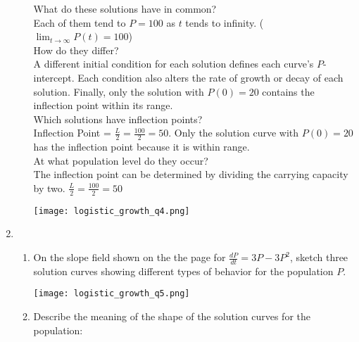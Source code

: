 \documentclass[10pt,letterpaper]{report}
\begin{document}
\begin{enumerate}
\begin{enumerate}
{    What do these solutions have in common? \\
    
    Each of them tend to $P=100$ as $t$ tends to infinity. ($\lim_{t\to\infty}P(t)=100$)\\
    
    How do they differ? \\
    
    A different initial condition for each solution defines each curve's $P$-intercept. Each condition also alters the rate of growth or decay of each solution. Finally, only the solution with $P(0)=20$ contains the inflection point within its range. \\
    
    Which solutions have inflection points? \\
    
    Inflection Point = $\frac{L}{2}=\frac{100}{2}=50$. Only the solution curve with $P(0)=20$ has the inflection point because it is within range. \\
    
    At what population level do they occur? \\
    
    The inflection point can be determined by dividing the carrying capacity by two. $\frac{L}{2}=\frac{100}{2}=50$ \\
    
    }
    
    \begin{center}
      \texttt{[image: logistic\_growth\_q4.png]}
    \end{center}
    
    \pagebreak
    
  \end{enumerate}
  \item{}
  \begin{enumerate}
    \item{On the slope field shown on the the page for $\frac{dP}{dt}=3P-3P^{2}$, sketch three solution curves showing different types of behavior for the population $P$. \\}
  
    \begin{center}
      \texttt{[image: logistic\_growth\_q5.png]}
    \end{center}
    
    \item{Describe the meaning of the shape of the solution curves for the population:\\
    
}
\end{enumerate}
\end{enumerate}
\end{document}
